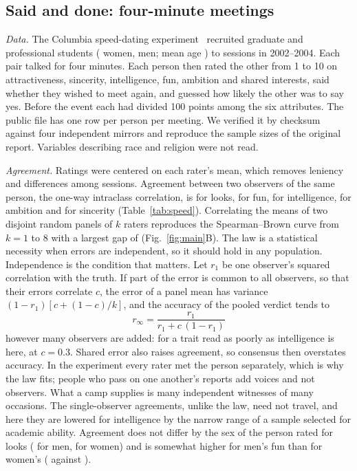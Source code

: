 \subsection{Said and done: \SdRows{} four-minute meetings}\label{sec:speed}

\emph{Data.} The Columbia speed-dating experiment~\cite{fisman2006} recruited \SdN{} graduate and professional students
(\SdW{} women, \SdM{} men; mean age \SdAge) to \SdSessions{} sessions in 2002--2004. Each pair talked for four minutes.
Each person then rated the other from 1 to 10 on attractiveness, sincerity, intelligence, fun, ambition and shared
interests, said whether they wished to meet again, and guessed how likely the other was to say yes. Before the event each
had divided 100 points among the six attributes. The public file has one row per person per meeting. We verified it by
checksum against four independent mirrors and reproduce the sample sizes of the original report. Variables describing race
and religion were not read.

\emph{Agreement.} Ratings were centered on each rater's mean, which removes leniency and differences among sessions.
Agreement between two observers of the same person, the one-way intraclass correlation, is \JurOneAtt{} for looks,
\JurOneFun{} for fun, \JurOneInt{} for intelligence, \JurOneAmb{} for ambition and \JurOneSin{} for sincerity
(Table~\ref{tab:speed}). Correlating the means of two disjoint random panels of $k$ raters reproduces the Spearman--Brown
curve from $k=1$ to 8 with a largest gap of \JurGapMax{} (Fig.~\ref{fig:main}B). The law is a statistical necessity when
errors are independent, so it should hold in any population. Independence is the condition that matters. Let $r_1$ be one
observer's squared correlation with the truth. If part of the error is common to all observers, so that their errors
correlate $c$, the error of a panel mean has variance $(1-r_1)[c+(1-c)/k]$, and the accuracy of the pooled verdict tends to
\begin{equation}
r_\infty=\frac{r_1}{r_1+c\,(1-r_1)}\label{eq:ceiling}
\end{equation}
however many observers are added: \JurCeil{} for a trait read as poorly as intelligence is here, at $c=0.3$. Shared error
also raises agreement, so consensus then overstates accuracy. In the experiment every rater met the person separately,
which is why the law fits; people who pass on one another's reports add voices and not observers. What a camp supplies is
many independent witnesses of many occasions. The single-observer agreements, unlike the law, need not travel, and here
they are lowered for intelligence by the narrow range of a sample selected for academic ability. Agreement does not differ by the
sex of the person rated for looks (\JurAttMen{} for men, \JurAttWomen{} for women) and is somewhat higher for men's fun
than for women's (\JurFunMen{} against \JurFunWomen).

